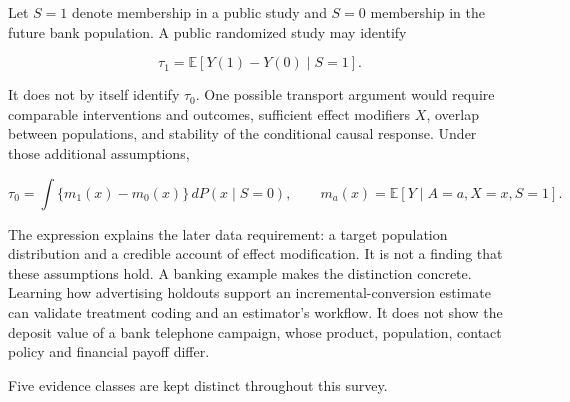 Let \(S=1\) denote membership in a public study and \(S=0\) membership
in the future bank population. A public randomized study may identify

\[
\tau_1=\mathbb E[Y(1)-Y(0)\mid S=1].
\]

It does not by itself identify \(\tau_0\). One possible transport
argument would require comparable interventions and outcomes, sufficient
effect modifiers \(X\), overlap between populations, and stability of
the conditional causal response. Under those additional assumptions,

\[
\tau_0=\int\{m_1(x)-m_0(x)\}\,dP(x\mid S=0),
\qquad m_a(x)=\mathbb E[Y\mid A=a,X=x,S=1].
\]

The expression explains the later data requirement: a target population
distribution and a credible account of effect modification. It is not a
finding that these assumptions hold. A banking example makes the
distinction concrete. Learning how advertising holdouts support an
incremental-conversion estimate can validate treatment coding and an
estimator's workflow. It does not show the deposit value of a bank
telephone campaign, whose product, population, contact policy and
financial payoff differ.

Five evidence classes are kept distinct throughout this survey.

